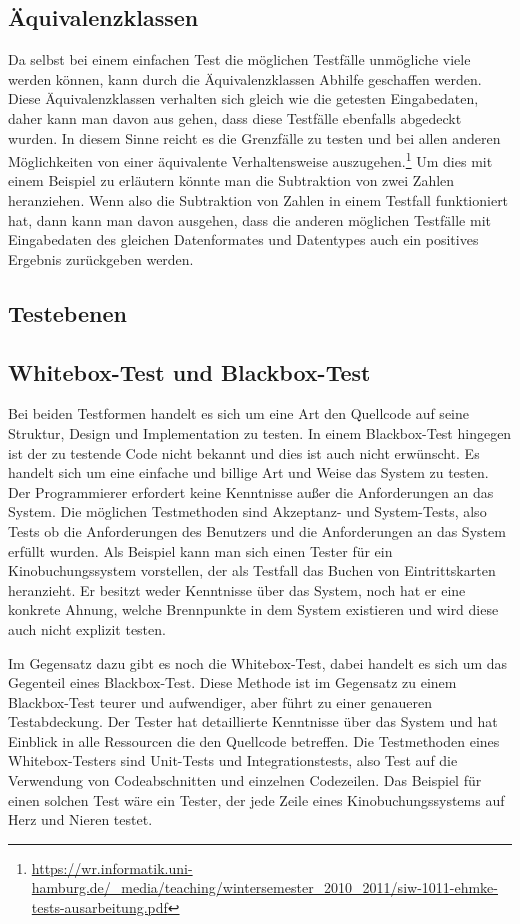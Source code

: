 \subsection{Äquivalenzklassen}
Da selbst bei einem einfachen Test die möglichen Testfälle unmögliche viele werden können, kann durch die Äquivalenzklassen Abhilfe geschaffen werden. 
Diese Äquivalenzklassen verhalten sich gleich wie die getesten Eingabedaten, daher kann man davon aus gehen, dass diese Testfälle ebenfalls abgedeckt wurden. 
In diesem Sinne reicht es die Grenzfälle zu testen und bei allen anderen Möglichkeiten von einer äquivalente Verhaltensweise auszugehen.\footnote{\url{https://wr.informatik.uni-hamburg.de/_media/teaching/wintersemester_2010_2011/siw-1011-ehmke-tests-ausarbeitung.pdf}}  
Um dies mit einem Beispiel zu erläutern könnte man die Subtraktion von zwei Zahlen heranziehen. 
Wenn also die Subtraktion von Zahlen in einem Testfall funktioniert hat, dann kann man davon ausgehen, dass die anderen möglichen Testfälle mit Eingabedaten des gleichen Datenformates und Datentypes auch ein positives Ergebnis zurückgeben werden.

\subsection{Testebenen}


\subsection{Whitebox-Test und Blackbox-Test}
Bei beiden Testformen handelt es sich um eine Art den Quellcode auf seine Struktur, Design und Implementation zu testen. 
In einem Blackbox-Test hingegen ist der zu testende Code nicht bekannt und dies ist auch nicht erwünscht. 
Es handelt sich um eine einfache und billige Art und Weise das System zu testen. 
Der Programmierer erfordert keine Kenntnisse außer die Anforderungen an das System. Die möglichen Testmethoden sind Akzeptanz- und System-Tests, also Tests ob die Anforderungen des Benutzers und die Anforderungen an das System erfüllt wurden.  
Als Beispiel kann man sich einen Tester für ein Kinobuchungssystem vorstellen, der als Testfall das Buchen von Eintrittskarten heranzieht. 
Er besitzt weder Kenntnisse über das System, noch hat er eine konkrete Ahnung, welche Brennpunkte in dem System existieren und wird diese auch nicht explizit testen. 

Im Gegensatz dazu gibt es noch die Whitebox-Test, dabei handelt es sich um das Gegenteil eines Blackbox-Test.
Diese Methode ist im Gegensatz zu einem Blackbox-Test teurer und aufwendiger, aber führt zu einer genaueren Testabdeckung.
Der Tester hat detaillierte Kenntnisse über das System und hat Einblick in alle Ressourcen die den Quellcode betreffen.  
Die Testmethoden eines Whitebox-Testers sind Unit-Tests und Integrationstests, also Test auf die Verwendung von Codeabschnitten und einzelnen Codezeilen.
Das Beispiel für einen solchen Test wäre ein Tester, der jede Zeile eines Kinobuchungssystems auf Herz und Nieren testet. 